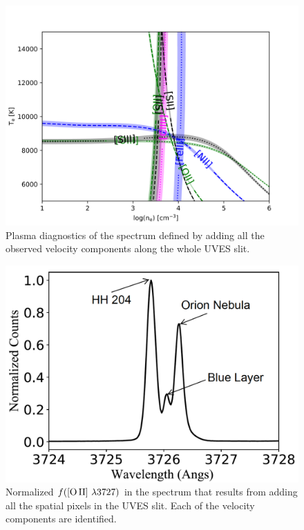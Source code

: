 \documentclass[twocolumn,linenumbers]{aastex63}
\begin{document}
\begin{figure}
\centering
\includegraphics[width=\columnwidth]{physical_diag_integrado.png}
\caption{Plasma diagnostics of the spectrum defined by adding all the observed velocity components along the whole UVES slit.}
\label{fig:plasma_mixed}
\end{figure}


\begin{figure}
\centering
\includegraphics[width=\columnwidth]{low_spectral_flux.pdf}
\caption{Normalized $f(\text{[O\thinspace II] } \lambda 3727)$ in the spectrum that results from adding all the spatial pixels in the UVES slit. Each of the velocity components are identified.}
\label{fig:low_spectral_flux_3727}
\end{figure}
\end{document}
